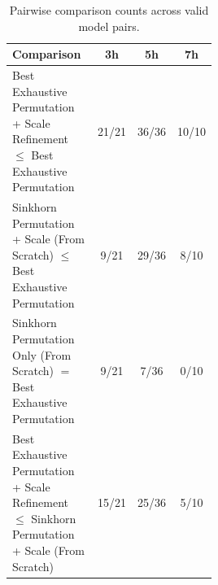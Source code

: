 \documentclass[11pt,a4paper]{article}
\begin{document}
\begin{table}[H]
\centering
\small
\begin{tabular}{p{0.50\linewidth}ccc}
\toprule
\textbf{Comparison} & \textbf{3h} & \textbf{5h} & \textbf{7h} \\
\midrule
Best Exhaustive Permutation + Scale Refinement $\leq$ Best Exhaustive Permutation & 21/21 & 36/36 & 10/10 \\
Sinkhorn Permutation + Scale (From Scratch) $\leq$ Best Exhaustive Permutation & 9/21 & 29/36 & 8/10 \\
Sinkhorn Permutation Only (From Scratch) $=$ Best Exhaustive Permutation & 9/21 & 7/36 & 0/10 \\
Best Exhaustive Permutation + Scale Refinement $\leq$ Sinkhorn Permutation + Scale (From Scratch) & 15/21 & 25/36 & 5/10 \\
\bottomrule
\end{tabular}
\caption{Pairwise comparison counts across valid model pairs.}
\label{tab:xor_pairwise}
\end{table}
\end{document}
